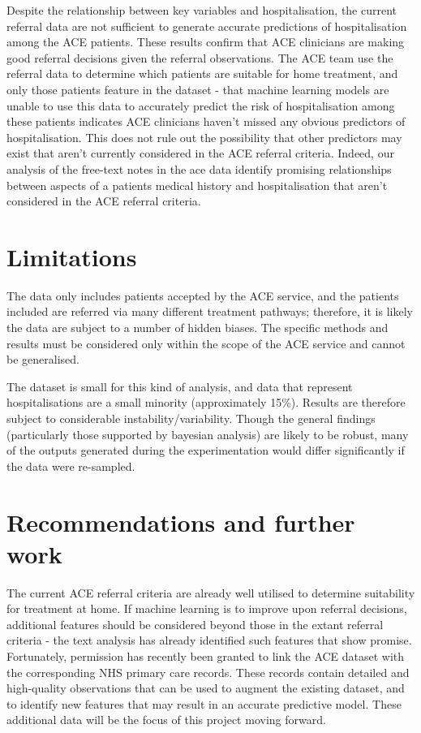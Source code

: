 Despite the relationship between key variables and hospitalisation, the current referral data are not sufficient to generate accurate predictions of hospitalisation among the ACE patients. These results confirm that ACE clinicians are making good referral decisions given the referral observations. The ACE team use the referral data to determine which patients are suitable for home treatment, and only those patients feature in the dataset - that machine learning models are unable to use this data to accurately predict the risk of hospitalisation among these patients indicates ACE clinicians haven't missed any obvious predictors of hospitalisation. This does not rule out the possibility that other predictors may exist that aren't currently considered in the ACE referral criteria. Indeed, our analysis of the free-text notes in the ace data identify promising relationships between aspects of a patients medical history and hospitalisation that aren't considered in the ACE referral criteria.

\section*{Limitations}\label{sec:limitations}

The data only includes patients accepted by the ACE service, and the patients included are referred via many different treatment pathways;
therefore, it is likely the data are subject to a number of hidden biases.
The specific methods and results must be considered only within the scope of the ACE service and cannot be generalised.

The dataset is small for this kind of analysis, and data that represent hospitalisations are a small minority (approximately 15\%).
Results are therefore subject to considerable instability/variability.
Though the general findings (particularly those supported by bayesian analysis) are likely to be robust, many of the outputs generated during the experimentation would differ significantly if the data were re-sampled.

\section*{Recommendations and further work}\label{sec:recommendations-and-further-work}

The current ACE referral criteria are already well utilised to determine suitability for treatment at home. If machine learning is to improve upon referral decisions, additional features should be considered beyond those in the extant referral criteria - the text analysis has already identified such features that show promise.    Fortunately, permission has recently been granted to link the ACE dataset with the corresponding NHS primary care records. These records contain detailed and high-quality observations that can be used to augment the existing dataset, and to identify new features that may result in an accurate predictive model. These additional data will be the focus of this project moving forward.


